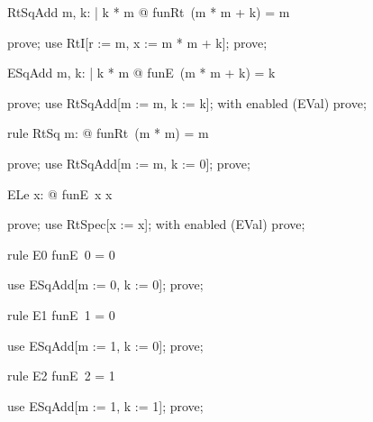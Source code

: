 \documentclass{article}
\begin{document}
\begin{theorem}{RtSqAdd}
  \forall m, k: \nat | k  * m @ funRt~(m * m + k) = m
\end{theorem}

\begin{zproof}
prove;
use RtI[r := m, x := m * m + k];
prove;
\end{zproof}

\begin{theorem}{ESqAdd}
  \forall m, k: \nat | k  * m @ funE~(m * m + k) = k
\end{theorem}

\begin{zproof}
prove;
use RtSqAdd[m := m, k := k];
with enabled (EVal) prove;
\end{zproof}

\begin{theorem}{rule RtSq}
  \forall m: \nat @ funRt~(m * m) = m
\end{theorem}

\begin{zproof}
prove;
use RtSqAdd[m := m, k := 0];
prove;
\end{zproof}

\begin{theorem}{ELe}
  \forall x: \nat @ funE~x \leq x
\end{theorem}

\begin{zproof}
prove;
use RtSpec[x := x];
with enabled (EVal) prove;
\end{zproof}

\begin{theorem}{rule E0}
  funE~0 = 0
\end{theorem}

\begin{zproof}
use ESqAdd[m := 0, k := 0];
prove;
\end{zproof}

\begin{theorem}{rule E1}
  funE~1 = 0
\end{theorem}

\begin{zproof}
use ESqAdd[m := 1, k := 0];
prove;
\end{zproof}

\begin{theorem}{rule E2}
  funE~2 = 1
\end{theorem}

\begin{zproof}
use ESqAdd[m := 1, k := 1];
prove;
\end{zproof}
\end{document}
